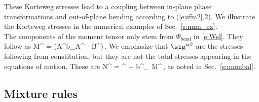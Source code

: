 \documentclass[11pt]{article}
\begin{document}
\label{e:sigCH}\eqe
These Korteweg stresses lead to a coupling between in-plane phase transformations and out-of-plane bending according to (\ref{e:sfm2}.2). 
We illustrate the Korteweg stresses in the numerical examples of Sec.~\ref{s:num_ex}. 
\\
The components of the moment tensor only stem from $\Psi_{\mathrm{bend}}$ in \eqref{e:Wel}. 
They follow as 
M^{\alpha\beta}  = \ds{}\big(A^{\alpha\gamma}b_{\gamma\delta}A^{\beta\delta} - B^{\alpha\beta}\big)\,.
\label{e:Mab}\eqe
%
We emphasize that $\sig^{\alpha\beta}$ are the stresses following from constitution, but they are not the total stresses appearing in the equations of motion. 
These are
N^{\alpha \beta} = \sig^{\alpha \beta} + b^\beta_{\gamma} M^{\gamma\alpha}\,,
\label{e:Ntot}\eqe
as noted in Sec.~\ref{s:mombal}.

\subsection{Mixture rules}\label{s:mix}
\end{document}
